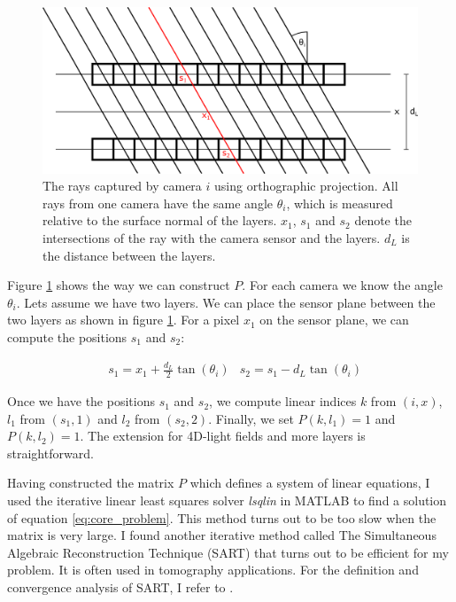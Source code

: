\documentclass[11pt,a4paper,titlepage]{article}
\begin{document}
\begin{figure}[h]
	\centering
	\includegraphics[scale=0.5]{sketches/layers_orthographic_rays.png} 
	\caption{The rays captured by camera $i$ using orthographic projection. All rays from one camera have the same angle $\theta_i$, which is measured relative to the surface normal of the layers. $x_1$, $s_1$ and $s_2$ denote the intersections of the ray with the camera sensor and the layers. $d_L$ is the distance between the layers.}
	\label{fig:orthographic_cameras_layers_sketch}
\end{figure}

Figure \ref{fig:orthographic_cameras_layers_sketch} shows the way we can construct $P$. For each camera we know the angle $\theta_i$. Lets assume we have two layers. We can place the sensor plane between the two layers as shown in figure \ref{fig:orthographic_cameras_layers_sketch}. For a pixel $x_1$ on the sensor plane, we can compute the positions $s_1$ and $s_2$:

\begin{align*}
	& s_1 = x_1 + \frac{d_L}{2}\tan\left( \theta_i \right) & s_2 = s_1 - d_L \tan\left( \theta_i \right)
\end{align*}

Once we have the positions $s_1$ and $s_2$, we compute linear indices $k$ from $\left(i, x\right)$, $l_1$ from $\left(s_1, 1\right)$ and $l_2$ from $\left(s_2, 2\right)$. Finally, we set $P\left(k, l_1\right) = 1$ and $P\left(k, l_2\right) = 1$. The extension for 4D-light fields and more layers is straightforward.

Having constructed the matrix $P$ which defines a system of linear equations, I used the iterative  linear least squares solver \emph{lsqlin} in MATLAB to find a solution of equation \ref{eq:core_problem}. This method turns out to be too slow when the matrix is very large. I found another iterative method called The Simultaneous Algebraic Reconstruction Technique (SART) that turns out to be efficient for my problem. It is often used in tomography applications. For the definition and convergence analysis of SART, I refer to \cite{CONV_SART}. 
\end{document}
